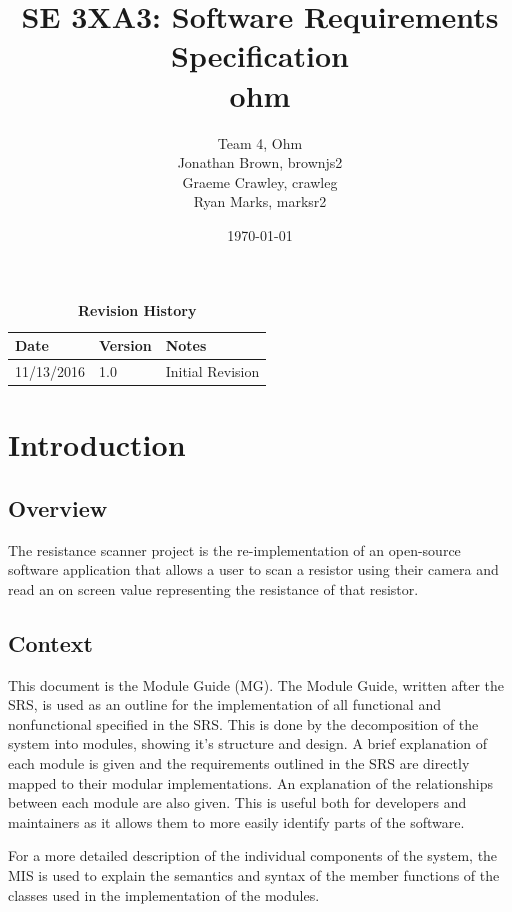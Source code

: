 \documentclass[12pt, titlepage]{article}
\title{SE 3XA3: Software Requirements Specification\\ ohm}
\author{Team 4, Ohm
		\\ Jonathan Brown, brownjs2
		\\ Graeme Crawley, crawleg
		\\ Ryan Marks, marksr2
}
\date{\today}
\begin{document}
\maketitle

\begin{table}[h]
\caption{\bf Revision History}
\begin{tabularx}{\textwidth}{p{3cm}p{2cm}X}
\toprule {\bf Date} & {\bf Version} & {\bf Notes}\\
\midrule
11/13/2016 & 1.0 & Initial Revision\\
\bottomrule
\end{tabularx}
\end{table}

\newpage
{}
\tableofcontents
\listoftables
\listoffigures



\newpage


\section{Introduction}
\subsection{Overview}
The resistance scanner project is the re-implementation of an open-source software application that allows a user to scan a resistor using their camera and read an on screen value representing the resistance of that resistor.

\subsection{Context}
\par This document is the Module Guide (MG). The Module Guide, written after the SRS, is used as an outline for the implementation of all functional and nonfunctional specified in the SRS. This is done by the decomposition of the system into modules, showing it's structure and design. A brief explanation of each module is given and the requirements outlined in the SRS are directly mapped to their modular implementations. An explanation of the relationships between each module are also given. This is useful both for developers and maintainers as it allows them to more easily identify parts of the software.
\par For a more detailed description of the individual components of the system, the MIS is used to explain the semantics and syntax of the member functions of the classes used in the implementation of the modules.
\end{document}
